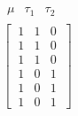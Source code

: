 \documentclass[preview]{standalone}
\begin{document}
\begin{align*}
\begin{array}{c}\begin{matrix}\mu & \!\tau_1\! & \tau_2\end{matrix} \\\left[\ \begin{matrix}1 & 1 & 0 \\1 & 1 & 0 \\1 & 1 & 0 \\1 & 0 & 1 \\1 & 0 & 1 \\1 & 0 & 1\end{matrix}\ \right]\end{array}
\end{align*}
\end{document}
